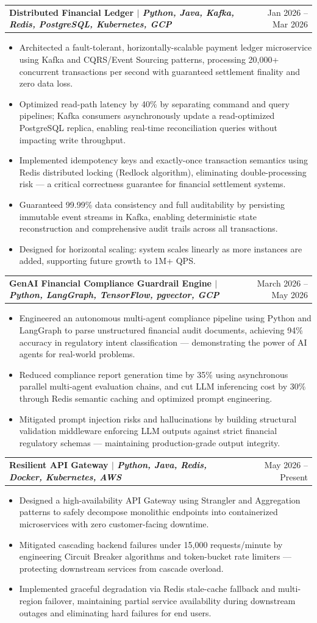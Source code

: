 \documentclass[letterpaper,11pt]{article}
\makeatletter
\newcommand{\resumeItem}[1]{\item\small{{#1 \vspace{-2pt}}}}
\newcommand{\resumeProjectHeading}[2]{
    \item
    \begin{tabular*}{0.97\textwidth}{l@{\extracolsep{\fill}}r}
      \small\textbf{#1} & #2 \\
    \end{tabular*}\vspace{-7pt}
}
\newcommand{\resumeItemListStart}{\begin{itemize}}
\newcommand{\resumeItemListEnd}{\end{itemize}\vspace{-5pt}}
\makeatother
\begin{document}
      \resumeProjectHeading
          {\textbf{Distributed Financial Ledger} $|$ \emph{Python, Java, Kafka, Redis, PostgreSQL, Kubernetes, GCP}}{Jan 2026 -- Mar 2026}
          \resumeItemListStart
            \resumeItem{Architected a fault-tolerant, horizontally-scalable payment ledger microservice using Kafka and CQRS/Event Sourcing patterns, processing 20,000+ concurrent transactions per second with guaranteed settlement finality and zero data loss.}
            \resumeItem{Optimized read-path latency by 40\% by separating command and query pipelines; Kafka consumers asynchronously update a read-optimized PostgreSQL replica, enabling real-time reconciliation queries without impacting write throughput.}
            \resumeItem{Implemented idempotency keys and exactly-once transaction semantics using Redis distributed locking (Redlock algorithm), eliminating double-processing risk --- a critical correctness guarantee for financial settlement systems.}
            \resumeItem{Guaranteed 99.99\% data consistency and full auditability by persisting immutable event streams in Kafka, enabling deterministic state reconstruction and comprehensive audit trails across all transactions.}
            \resumeItem{Designed for horizontal scaling: system scales linearly as more instances are added, supporting future growth to 1M+ QPS.}
          \resumeItemListEnd

      \resumeProjectHeading
          {\textbf{GenAI Financial Compliance Guardrail Engine} $|$ \emph{Python, LangGraph, TensorFlow, pgvector, GCP}}{March 2026 -- May 2026}
          \resumeItemListStart
            \resumeItem{Engineered an autonomous multi-agent compliance pipeline using Python and LangGraph to parse unstructured financial audit documents, achieving 94\% accuracy in regulatory intent classification --- demonstrating the power of AI agents for real-world problems.}
            \resumeItem{Reduced compliance report generation time by 35\% using asynchronous parallel multi-agent evaluation chains, and cut LLM inferencing cost by 30\% through Redis semantic caching and optimized prompt engineering.}
            \resumeItem{Mitigated prompt injection risks and hallucinations by building structural validation middleware enforcing LLM outputs against strict financial regulatory schemas --- maintaining production-grade output integrity.}
          \resumeItemListEnd

      \resumeProjectHeading
          {\textbf{Resilient API Gateway} $|$ \emph{Python, Java, Redis, Docker, Kubernetes, AWS}}{May 2026 -- Present}
          \resumeItemListStart
            \resumeItem{Designed a high-availability API Gateway using Strangler and Aggregation patterns to safely decompose monolithic endpoints into containerized microservices with zero customer-facing downtime.}
            \resumeItem{Mitigated cascading backend failures under 15,000 requests/minute by engineering Circuit Breaker algorithms and token-bucket rate limiters --- protecting downstream services from cascade overload.}
            \resumeItem{Implemented graceful degradation via Redis stale-cache fallback and multi-region failover, maintaining partial service availability during downstream outages and eliminating hard failures for end users.}
          \resumeItemListEnd
\end{document}
